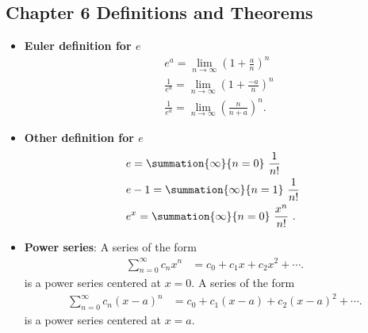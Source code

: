 \documentclass{report}
\begin{document}
\pagebreak \bigbreak \noindent 
\subsection{Chapter 6 Definitions and Theorems}
\begin{itemize}
    \item \textbf{Euler definition for $e$}
        \begin{align*}
                &e^{a} = \lim\limits_{n \to \infty}{\left(1+\frac{a}{n}\right)^{n}} \\
                &\frac{1}{e^{a}} = \lim\limits_{n \to \infty}{\left(1+\frac{-a}{n}\right)^{n}} \\ 
                &\frac{1}{e^{a}} = \lim\limits_{n \to \infty}{\left(\frac{n}{n+a}\right)^{n}}
            .\end{align*}
        \item \textbf{Other definition for $e $}
            \begin{align*}
                &e = \summation{\infty}{n=0}\ \frac{1}{n!}\  \\
                &e-1 = \summation{\infty}{n=1}\ \frac{1}{n!}\ \\
                &e^{x} = \summation{\infty}{n=0}\ \frac{x^{n}}{n!}\ 
            .\end{align*}
        \item \textbf{Power series}:
            A series of the form
            \begin{align*}
                \sum_{n=0}^{\infty} c_n x^n &= c_0 + c_1 x + c_2 x^2 + \cdots 
            .\end{align*}
            is a power series centered at \( x = 0 \).
            \bigbreak \noindent 
            A series of the form
            \begin{align*}
                \sum_{n=0}^{\infty} c_n (x - a)^n &= c_0 + c_1 (x - a) + c_2 (x - a)^2 + \cdots 
            .\end{align*}
            is a power series centered at \( x = a \).


\end{itemize}
\end{document}
